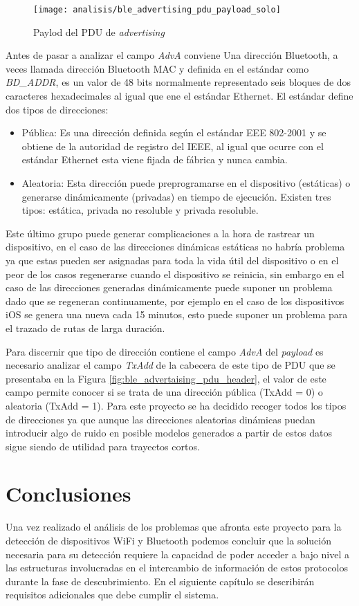 \documentclass[../proyecto.tex]{subfiles}
\begin{document}
\begin{figure}[H]
\centering
\texttt{[image: analisis/ble\_advertising\_pdu\_payload\_solo]}
\caption{Paylod del PDU de \textit{advertising}}
\label{fig:ble_advertising_pdu_payload_solo}
\end{figure}

Antes de pasar a analizar el campo \textit{AdvA} conviene
Una dirección Bluetooth, a veces llamada dirección Bluetooth MAC y definida en el estándar como \textit{BD\_ADDR}, es un valor de 48 bits normalmente representado seis bloques de dos caracteres hexadecimales al igual que ene el estándar Ethernet. El estándar define dos tipos de direcciones:

\begin{itemize}
  \item Pública: Es una dirección definida según el estándar EEE 802-2001 y se obtiene de la autoridad de registro del IEEE, al igual que ocurre con el estándar Ethernet esta viene fijada de fábrica y nunca cambia.
  \item Aleatoria: Esta dirección puede preprogramarse en el dispositivo (estáticas) o generarse dinámicamente (privadas) en tiempo de ejecución. Existen tres tipos: estática, privada no resoluble y privada resoluble.
\end{itemize}

Este último grupo puede generar complicaciones a la hora de rastrear un dispositivo, en el caso de las direcciones dinámicas estáticas no habría problema ya que estas pueden ser asignadas para toda la vida útil del dispositivo o en el peor de los casos regenerarse cuando el dispositivo se reinicia, sin embargo en el caso de las direcciones generadas dinámicamente puede suponer un problema dado que se regeneran continuamente, por ejemplo en el caso de los dispositivos iOS se genera una nueva cada 15 minutos, esto puede suponer un problema para el trazado de rutas de larga duración.

Para discernir que tipo de dirección contiene el campo \textit{AdvA} del \textit{payload} es necesario analizar el campo \textit{TxAdd} de la cabecera de este tipo de PDU que se presentaba en la Figura \ref{fig:ble_advertaising_pdu_header}, el valor de este campo permite conocer si se trata de una dirección pública (TxAdd = 0) o aleatoria (TxAdd = 1). Para este proyecto se ha decidido recoger todos los tipos de direcciones ya que aunque las direcciones aleatorias dinámicas puedan introducir algo de ruido en posible modelos generados a partir de estos datos sigue siendo de utilidad para trayectos cortos.

\section{Conclusiones}

Una vez realizado el análisis de los problemas que afronta este proyecto para la detección de dispositivos WiFi y Bluetooth podemos concluir que la solución necesaria para su detección requiere la capacidad de  poder acceder a bajo nivel a las estructuras involucradas en el intercambio de información de estos protocolos durante la fase de descubrimiento. En el siguiente capítulo se describirán requisitos adicionales que debe cumplir el sistema.\\
\end{document}
